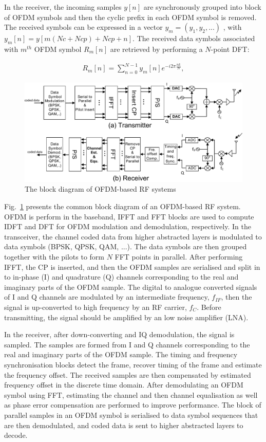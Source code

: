 In the receiver, the incoming samples $y[n]$ are synchronously  grouped into block of OFDM symbols and then the cyclic prefix in each OFDM symbol is removed.
The received symbols can be expressed in a vector $y_{m} = (y_{1}, y_{2}, . . . )$ , with $y_{m}[n]=y[m(Nc+Ncp)+Ncp +n]$.
The received data symbols associated with $m^{th}$ OFDM symbol $R_{m}[n]$ are retrieved by performing a $N$-point DFT:

\begin{eqnarray}
\label{equ:receiveOFDMsymbol}
R_{m}[n] =  \sum_{n=0}^{N-1} y_{m}[n]e^{-i2\pi \frac{nk}{N}},
\end{eqnarray}

\begin{figure}
	\centerline{\includegraphics [width=0.8\columnwidth] {Figures/OFDM-block.pdf} }
	\caption{The block diagram of OFDM-based RF systems}
	\label{fig:OFDM-block}
\end{figure}

Fig.~\ref{fig:OFDM-block} presents the common block diagram of an OFDM-based RF system.
OFDM is perform in the baseband, IFFT and FFT blocks are used to compute IDFT and DFT for OFDM modulation and demodulation, respectively.
In the transceiver, the channel coded data from higher abstracted layers is modulated to data symbols (BPSK, QPSK, QAM, ...). The data symbols are then grouped together with the pilots to form $N$ FFT points in parallel.
After performing IFFT, the CP is inserted, and then the OFDM samples are serialised and split in to in-phase (I) and quadrature (Q) channels corresponding to the real and imaginary parts of  the OFDM sample.
The digital to analogue converted signals of I and Q channels are modulated by an intermediate frequency, $f_{IF}$, then the signal is up-converted to high frequency by an RF carrier, $f_{C}$.
Before transmitting, the signal should be amplified by an low noise amplifier (LNA).

In the receiver, after down-converting and IQ demodulation, the signal is sampled. The samples are formed from I and Q channels corresponding to the real and imaginary parts of the OFDM sample.
The timing and frequency synchronisation blocks detect the frame, recover timing of the frame and estimate the frequency offset.
The received samples are then compensated by estimated frequency offset in the discrete time domain.
After demodulating an OFDM symbol using FFT, estimating the channel and then channel equalisation as well as phase error compensation are performed to improve performance.
The block of parallel samples in an OFDM symbol is serialised to data symbol sequences that are then demodulated, and coded data is sent to higher abstracted layers to decode.


